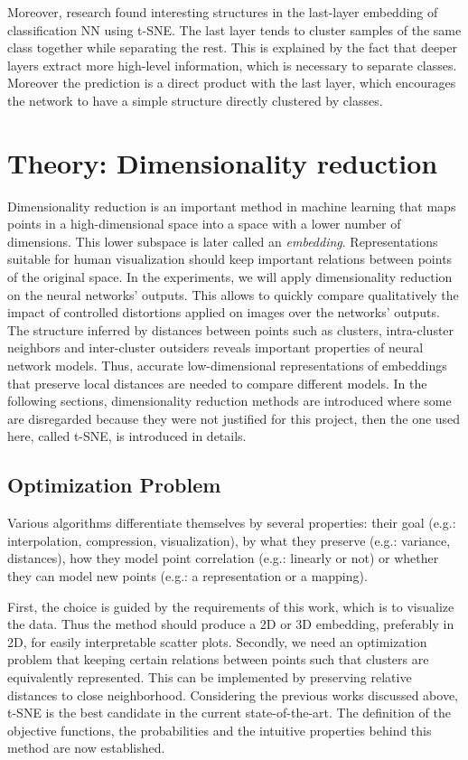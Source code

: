 \documentclass[a4paper,12pt]{report}
\newcommand{\eg}{e.g.}
\begin{document}
Moreover, research found interesting structures in the last-layer embedding of classification NN using t-SNE.
The last layer tends to cluster samples of the same class together while separating the rest\cite{donahue2013decaf}\cite{yu2014visualizing}.
This is explained by the fact that deeper layers extract more high-level information, which is necessary to separate classes. Moreover the prediction is a direct product with the last layer, which encourages the network to have a simple structure directly clustered by classes.


\chapter{Theory: Dimensionality reduction}
\label{chap:dim_red}
Dimensionality reduction is an important method in machine learning that maps points in a high-dimensional space into a space with a lower number of dimensions.
This lower subspace is later called an {\em embedding}.
Representations suitable for human visualization should keep important relations between points of the original space.
In the experiments, we will apply dimensionality reduction on the neural networks' outputs.
This allows to quickly compare qualitatively the impact of controlled distortions applied on images over the networks' outputs.
The structure inferred by distances between points such as clusters, intra-cluster neighbors and inter-cluster outsiders reveals important properties of neural network models.
Thus, accurate low-dimensional representations of embeddings that preserve local distances are needed to compare different models.
In the following sections, dimensionality reduction methods are introduced where some are disregarded because they were not justified for this project, then the one used here, called t-SNE, is introduced in details.

\section{Optimization Problem}
Various algorithms differentiate themselves by several properties: their goal (\eg: interpolation, compression, visualization), by what they preserve (\eg: variance, distances), how they model point correlation (\eg: linearly or not) or whether they can model new points (\eg: a representation or a mapping).

First, the choice is guided by the requirements of this work, which is to visualize the data.
Thus the method should produce a 2D or 3D embedding, preferably in 2D, for easily interpretable scatter plots.
Secondly, we need an optimization problem that keeping certain relations between points such that clusters are equivalently represented.
This can be implemented by preserving relative distances to close neighborhood.
Considering the previous works discussed above, t-SNE is the best candidate in the current state-of-the-art.
The definition of the objective functions, the probabilities and the intuitive properties behind this method are now established.
\end{document}
